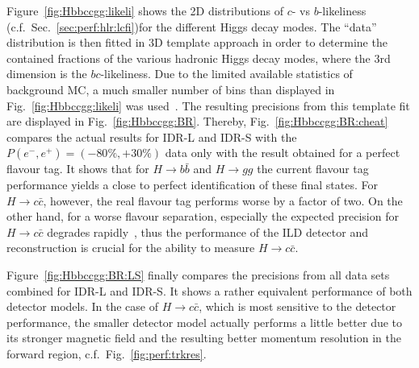 Figure~\ref{fig:Hbbccgg:likeli} shows the 2D distributions of $c$- vs $b$-likeliness (c.f.\ Sec.~\ref{sec:perf:hlr:lcfi})for the different Higgs decay modes. The ``data'' distribution is then fitted in 3D template approach in order to determine the contained fractions of the various hadronic Higgs decay modes, where the 3rd dimension is the $bc$-likeliness. Due to the limited available statistics of background MC, a much smaller number of bins than displayed in Fig.~\ref{fig:Hbbccgg:likeli} was used~\cite{ILDNote:Hbbccgg}. The resulting precisions from this template fit are displayed in Fig.~\ref{fig:Hbbccgg:BR}. Thereby, Fig.~\ref{fig:Hbbccgg:BR:cheat} compares the actual results for IDR-L and IDR-S with the $P(e^-,e^+)=(-80\%,+30\%)$ data only with the  result obtained for a perfect flavour tag. It shows that for $H \to b\bar{b}$ and $H \to gg$ the current flavour tag performance yields a close to perfect identification of these final states. For $H \to c\bar{c}$, however, the
real flavour tag performs worse by a factor of two. On the other hand, for a worse flavour separation, especially the expected precision for $H \to c\bar{c}$ degrades rapidly~\cite{ILDNote:Hbbccgg},
thus the performance of the ILD detector and reconstruction is crucial for the ability to measure $H \to c\bar{c}$.

Figure~\ref{fig:Hbbccgg:BR:LS} finally compares the precisions from all data sets combined for IDR-L and IDR-S. It shows a rather equivalent performance of both detector models. In the case of $H \to c\bar{c}$, which is most sensitive to the detector performance, the smaller detector model actually performs a little better due to its stronger magnetic field and the resulting better momentum resolution in the forward region, c.f.\ Fig.~\ref{fig:perf:trkres}.

